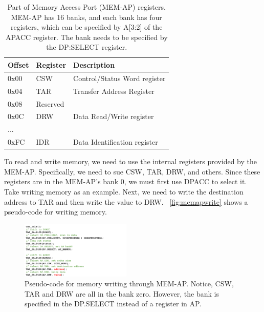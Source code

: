 \begin{center}
	\begin{table}
		\begin{tabular}{l l l} 
			\hline
			Offset & Register &  Description  \\ 
			\hline
			0x00 & CSW & Control/Status Word register \\
			\hline
			0x04 & TAR & Transfer Address Register \\
			\hline
			0x08 & \multicolumn{2}{l}{Reserved} \\
			\hline
			0x0C & DRW & Data Read/Write register\\
			\hline
			... & & \\
			\hline
			0xFC & IDR & Data Identification register\\
			\hline
		\end{tabular}
		\caption{Part of Memory Access Port (MEM-AP) registers. MEM-AP has 16 banks, and each bank has four registers, which can be specified by A[3:2] of the APACC register. The bank needs to be specified by the DP:SELECT register.}
		\label{tab:memapreg}
	\end{table}
\end{center}





To read and write memory, we need to use the internal registers provided by the MEM-AP. Specifically, we need to sue CSW, TAR, DRW, and others. Since these registers are in the MEM-AP's bank 0, we must first use DPACC to select it. Take writing memory as an example. Next, we need to write the destination address to TAR and then write the value to DRW. ~\autoref{fig:memapwrite} shows a pseudo-code for writing memory.


\begin{figure}[ht]
	\includegraphics[width=0.47\textwidth]{figures/memapwrite2}
	\centering
	\caption{Pseudo-code for memory writing through MEM-AP. Notice, CSW, TAR and DRW are all in the bank zero. However, the bank is specified in the DP.SELECT instead of a register in AP.}
	\label{fig:memapwrite}
\end{figure}
